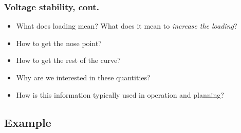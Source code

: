 \documentclass{beamer}
\newlength\fheight
\newlength\fwidth
\begin{document}
\begin{frame}
  \frametitle{Voltage stability, cont.}
  \begin{itemize}
  \item What does loading mean? What does it mean to \emph{increase the loading}?
  \item How to get the nose point?
  \item How to get the rest of the curve?
  \item Why are we interested in these quantities?
  \item How is this information typically used in operation and planning?
  \end{itemize}
\setlength\fheight{0.3\textheight} 
\setlength{}

\end{frame}

\subsection{Example}
\end{document}
